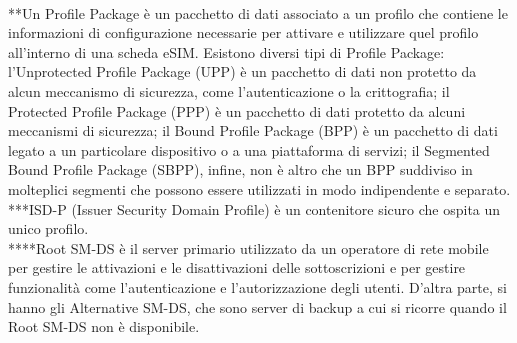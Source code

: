 \documentclass[10pt, twoside, openany]{book}
\begin{document}
\\**Un Profile Package è un pacchetto di dati associato a un profilo che contiene le informazioni di configurazione necessarie per attivare e utilizzare quel profilo all'interno di una scheda eSIM. Esistono diversi tipi di Profile Package: l'Unprotected Profile Package (UPP) è un pacchetto di dati non protetto da alcun meccanismo di sicurezza, come l'autenticazione o la crittografia; il Protected Profile Package (PPP) è un pacchetto di dati protetto da alcuni meccanismi di sicurezza; il Bound Profile Package (BPP) è un pacchetto di dati legato a un particolare dispositivo o a una piattaforma di servizi; il Segmented Bound Profile Package (SBPP), infine, non è altro che un BPP suddiviso in molteplici segmenti che possono essere utilizzati in modo indipendente e separato.\\
***ISD-P (Issuer Security Domain Profile) è un contenitore sicuro che ospita un unico profilo.\\
****Root SM-DS è il server primario utilizzato da un operatore di rete mobile per gestire le attivazioni e le disattivazioni delle sottoscrizioni e per gestire funzionalità come l'autenticazione e l'autorizzazione degli utenti. D'altra parte, si hanno gli Alternative SM-DS, che sono server di backup a cui si ricorre quando il Root SM-DS non è disponibile.
\end{document}

